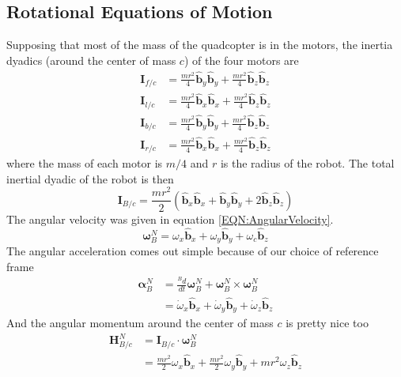 \documentclass[lettersize,journal]{IEEEtran}
\begin{document}
\subsection{Rotational Equations of Motion}
Supposing that most of the mass of the quadcopter is in the motors, the inertia dyadics (around the center of mass $c$) of the four motors are
\begin{align}
  \mathbf{I}_{f/c} &= \frac{mr^2}{4} \mathbf{\hat{b}}_y\mathbf{\hat{b}}_y + \frac{mr^2}{4} \mathbf{\hat{b}}_z \mathbf{\hat{b}}_z \\
  \mathbf{I}_{l/c} &= \frac{mr^2}{4} \mathbf{\hat{b}}_x\mathbf{\hat{b}}_x + \frac{mr^2}{4} \mathbf{\hat{b}}_z \mathbf{\hat{b}}_z \\
  \mathbf{I}_{b/c} &= \frac{mr^2}{4} \mathbf{\hat{b}}_y\mathbf{\hat{b}}_y + \frac{mr^2}{4} \mathbf{\hat{b}}_z \mathbf{\hat{b}}_z \\
  \mathbf{I}_{r/c} &= \frac{mr^2}{4} \mathbf{\hat{b}}_x\mathbf{\hat{b}}_x + \frac{mr^2}{4} \mathbf{\hat{b}}_z \mathbf{\hat{b}}_z
\end{align}
where the mass of each motor is $m/4$ and $r$ is the radius of the robot.
The total inertial dyadic of the robot is then
\begin{equation}
  \mathbf{I}_{B/c} = \frac{mr^2}{2} \left(\mathbf{\hat{b}}_x\mathbf{\hat{b}}_x + \mathbf{\hat{b}}_y\mathbf{\hat{b}}_y + 2 \mathbf{\hat{b}}_z\mathbf{\hat{b}}_z\right)
\end{equation}
The angular velocity was given in equation \ref{EQN:AngularVelocity}.
\begin{equation}
  {\boldsymbol\omega^N_B} = \omega_x\mathbf{\hat{b}}_x + \omega_y\mathbf{\hat{b}}_y + \omega_c \mathbf{\hat{b}}_z \nonumber
\end{equation}
The angular acceleration comes out simple because of our choice of reference frame
\begin{align}
  \boldsymbol\alpha^N_B &= \frac{^B d}{dt} \boldsymbol\omega^N_B +\boldsymbol\omega_B^N\times\boldsymbol\omega_B^N\nonumber\\
  &= \dot\omega_x \mathbf{\hat{b}}_x + \dot\omega_y \mathbf{\hat{b}}_y + \dot\omega_z \mathbf{\hat{b}}_z
\end{align}
And the angular momentum around the center of mass $c$ is pretty nice too
\begin{align}
  {\mathbf{H}^N_{B/c}}
  &= \mathbf{I}_{B/c} \cdot \boldsymbol\omega_B^N\nonumber \\
  &= \frac{mr^2}{2}\omega_x\mathbf{\hat{b}}_x + \frac{mr^2}{2}\omega_y\mathbf{\hat{b}}_y + mr^2\omega_z \mathbf{\hat{b}}_z
\end{align}
\end{document}
